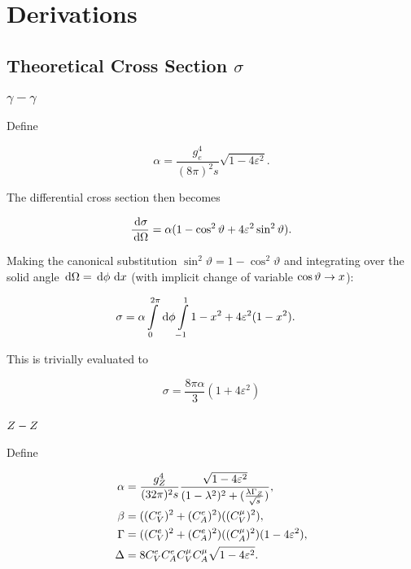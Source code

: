 \documentclass[]{report}
\begin{document}
\tableofcontents

\chapter{Derivations}

\section{Theoretical Cross Section $\sigma$}

\subsection{$\gamma-\gamma$}

Define

$$
\alpha = \frac{g_{e}^{4}}{(8\pi)^{2}s} \sqrt{1-4\varepsilon^{2}}.
$$

The differential cross section then becomes

$$
\frac{\,\operatorname{d}\!{\sigma}}{\,\operatorname{d}\!{\Omega}} = \alpha (1 - \cos^{2}{\vartheta} + 4\varepsilon^{2}\sin^{2}{\vartheta}).
$$

Making the canonical substitution $\sin^{2}{\vartheta} = 1 - \cos^{2}{\vartheta}$ and integrating over the solid angle $\,\operatorname{d}\!{\Omega} = \,\operatorname{d}\!{\phi}\,\operatorname{d}\!{x}$ (with implicit change of variable $\cos{\vartheta}\rightarrow x$):

\begin{align*}
\sigma &= \alpha \int\limits_{0}^{2\pi}\d{\phi} \int\limits_{-1}^{1} 1 - x^{2} + 4\varepsilon^{2}(1 - x^{2}).
\end{align*}

This is trivially evaluated to

$$
\sigma = \frac{8\pi\alpha}{3}(1+4\varepsilon^{2})
$$

\subsection{$Z -Z $}

Define

\begin{align*}
\alpha &= \frac{g_{\Zzero}^{4}}{(32\pi)^{2}s} \frac{\sqrt{1-4\varepsilon^{2}}}{(1-\lambda^{2})^{2} + (\frac{\lambda\Gamma_{\Zzero}}{\rts})},
\\
\beta &= ((C_{V}^{e})^{2} + (C_{A}^{e})^{2})((C_{V}^{\mu})^{2}),
\\
\Gamma &= ((C_{V}^{e})^{2} + (C_{A}^{e})^{2})((C_{A}^{\mu})^{2})(1-4\varepsilon^{2}),
\\
\Delta &= 8C_{V}^{e}C_{A}^{e}C_{V}^{\mu}C_{A}^{\mu}\sqrt{1-4\varepsilon^{2}}.
\end	{align*}
\end{document}
